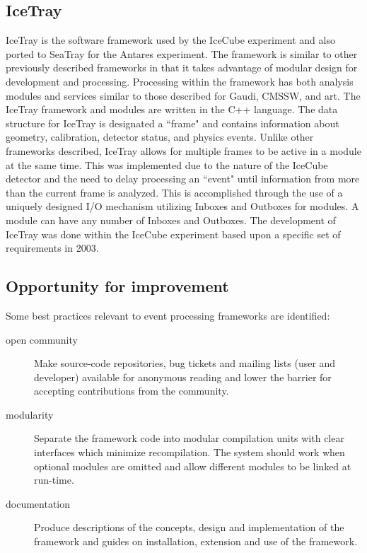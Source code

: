 \subsection{IceTray}

IceTray\cite{icetray} is the software framework used by the IceCube experiment and also ported to SeaTray for the Antares experiment. The framework is similar to other previously described frameworks in that it takes advantage of modular design for development and processing. Processing within the framework has both analysis modules and services similar to those described for Gaudi, CMSSW, and art. The IceTray framework and modules are written in the C++ language. The data structure for IceTray is designated a ``frame" and contains information about geometry, calibration, detector status, and physics events. Unlike other frameworks described, IceTray allows for multiple frames to be active in a module at the same time. This was implemented due to the nature of the IceCube detector and the need to delay processing an ``event" until information from more than the current frame is analyzed. This is accomplished through the use of a uniquely designed I/O mechanism utilizing Inboxes and Outboxes for modules. A module can have any number of Inboxes and Outboxes. The development of IceTray was done within the IceCube experiment based upon a specific set of requirements in 2003.

\subsection{Opportunity for improvement}

Some best practices relevant to event processing frameworks are identified:

\begin{description}
\item[open community] Make source-code repositories, bug tickets and
  mailing lists (user and developer) available for anonymous reading
  and lower the barrier for accepting contributions from the community.

\item[modularity] Separate the framework code into modular compilation
  units with clear interfaces which minimize recompilation.  The
  system should work when optional modules are omitted and allow
  different modules to be linked at run-time.

\item[documentation] Produce descriptions of the concepts, design and
  implementation of the framework and guides on installation,
  extension and use of the framework.
\end{description}

